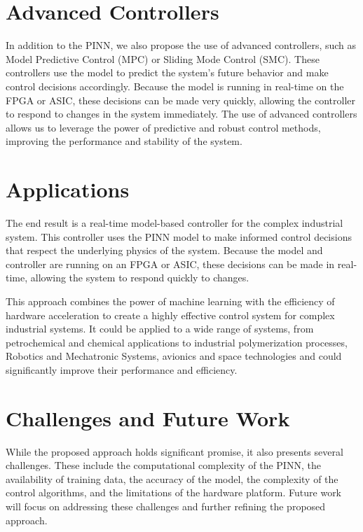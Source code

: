 \documentclass{article}
\begin{document}
	\section{Advanced Controllers}
	
	In addition to the PINN, we also propose the use of advanced controllers, such as Model Predictive Control (MPC) or Sliding Mode Control (SMC). These controllers use the model to predict the system's future behavior and make control decisions accordingly. Because the model is running in real-time on the FPGA or ASIC, these decisions can be made very quickly, allowing the controller to respond to changes in the system immediately. The use of advanced controllers allows us to leverage the power of predictive and robust control methods, improving the performance and stability of the system.
	
	\section{Applications}
	
	The end result is a real-time model-based controller for the complex industrial system. This controller uses the PINN model to make informed control decisions that respect the underlying physics of the system. Because the model and controller are running on an FPGA or ASIC, these decisions can be made in real-time, allowing the system to respond quickly to changes.
	
	This approach combines the power of machine learning with the efficiency of hardware acceleration to create a highly effective control system for complex industrial systems. It could be applied to a wide range of systems, from petrochemical and chemical applications to industrial polymerization processes, Robotics and Mechatronic Systems, avionics and space technologies and could significantly improve their performance and efficiency.
	
	\section{Challenges and Future Work}
	
	While the proposed approach holds significant promise, it also presents several challenges. These include the computational complexity of the PINN, the availability of training data, the accuracy of the model, the complexity of the control algorithms, and the limitations of the hardware platform. Future work will focus on addressing these challenges and further refining the proposed approach.
	
\end{document}
